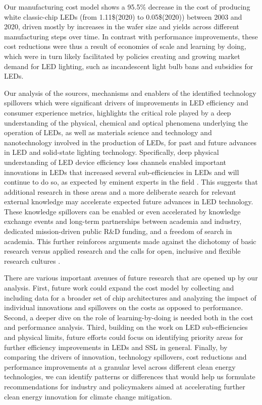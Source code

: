 \documentclass[journal=jacsat,manuscript=article]{achemso}
\begin{document}
Our manufacturing cost model shows a 95.5\% decrease in the cost of producing white classic-chip LEDs (from 1.11\$(2020) to 0.05\$(2020)) between 2003 and 2020, driven mostly by increases in the wafer size and yields across different manufacturing steps over time. In contrast with performance improvements, these cost reductions were thus a result of economies of scale and learning by doing,  which were in turn likely facilitated by policies creating and growing market demand for LED lighting, such as incandescent light bulb bans and subsidies for LEDs.

Our analysis of the sources, mechanisms and enablers of the identified technology spillovers which were significant drivers of improvements in LED efficiency and consumer experience metrics, highlights the critical role played by a deep understanding of the physical, chemical and optical phenomena underlying the operation of LEDs, as well as materials science and technology and nanotechnology involved in the production of LEDs, for past and future advances in LED and solid-state lighting technology. Specifically, deep physical understanding of LED device efficiency loss channels enabled important innovations in LEDs that increased several sub-efficiencies in LEDs and will continue to do so, as expected by eminent experts in the field \cite{Weisbuch2020}. This suggests that additional research in these areas and a more deliberate search for relevant external knowledge may accelerate expected future advances in LED technology. These knowledge spillovers can be enabled or even accelerated by knowledge exchange events and long-term partnerships between academia and industry, dedicated mission-driven public R\&D funding, and a freedom of search in academia. This further reinforces arguments made against the dichotomy of basic research versus applied research \cite{narayanamurti2016cycles,narayanamurti2021genesis} and the calls for open, inclusive and flexible research cultures \cite{Stephan2021}.

There are various important avenues of future research that are opened up by our analysis. First, future work could expand the cost model by collecting and including data for a broader set of chip architectures and analyzing the impact of individual innovations and spillovers on the costs as opposed to performance. Second, a deeper dive on the role of learning-by-doing is needed both in the cost and performance analysis. Third, building on the work on LED sub-efficiencies and physical limits, future efforts could focus on identifying priority areas for further efficiency improvements in LEDs and SSL in general. Finally, by comparing the drivers of innovation, technology spillovers, cost reductions and performance improvements at a granular level across different clean energy technologies, we can identify patterns or differences that would help us formulate recommendations for industry and policymakers aimed at accelerating further clean energy innovation for climate change mitigation. 
\end{document}
